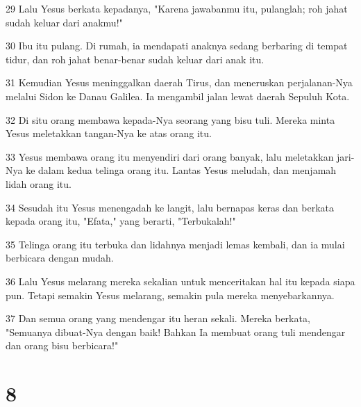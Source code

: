 \par 29 Lalu Yesus berkata kepadanya, "Karena jawabanmu itu, pulanglah; roh jahat sudah keluar dari anakmu!"
\par 30 Ibu itu pulang. Di rumah, ia mendapati anaknya sedang berbaring di tempat tidur, dan roh jahat benar-benar sudah keluar dari anak itu.
\par 31 Kemudian Yesus meninggalkan daerah Tirus, dan meneruskan perjalanan-Nya melalui Sidon ke Danau Galilea. Ia mengambil jalan lewat daerah Sepuluh Kota.
\par 32 Di situ orang membawa kepada-Nya seorang yang bisu tuli. Mereka minta Yesus meletakkan tangan-Nya ke atas orang itu.
\par 33 Yesus membawa orang itu menyendiri dari orang banyak, lalu meletakkan jari-Nya ke dalam kedua telinga orang itu. Lantas Yesus meludah, dan menjamah lidah orang itu.
\par 34 Sesudah itu Yesus menengadah ke langit, lalu bernapas keras dan berkata kepada orang itu, "Efata," yang berarti, "Terbukalah!"
\par 35 Telinga orang itu terbuka dan lidahnya menjadi lemas kembali, dan ia mulai berbicara dengan mudah.
\par 36 Lalu Yesus melarang mereka sekalian untuk menceritakan hal itu kepada siapa pun. Tetapi semakin Yesus melarang, semakin pula mereka menyebarkannya.
\par 37 Dan semua orang yang mendengar itu heran sekali. Mereka berkata, "Semuanya dibuat-Nya dengan baik! Bahkan Ia membuat orang tuli mendengar dan orang bisu berbicara!"

\chapter{8}

